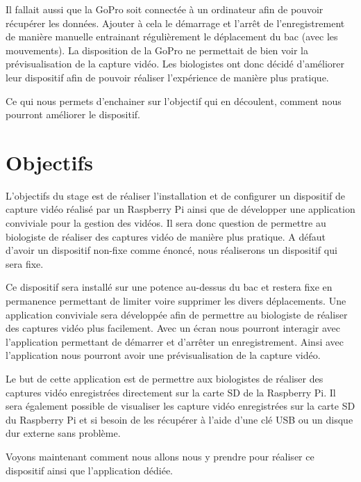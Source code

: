         \vspace{0.2cm}
        
        Il fallait aussi que la GoPro soit connectée à un ordinateur afin de pouvoir récupérer les données.
        Ajouter à cela le démarrage et l'arrêt de l'enregistrement de manière manuelle entrainant régulièrement le déplacement du bac (avec les mouvements). La disposition de la GoPro ne permettait de bien voir la prévisualisation de la capture vidéo.
        Les biologistes ont donc décidé d'améliorer leur dispositif afin de pouvoir réaliser l'expérience de manière plus pratique.

        \vspace{0.2cm}

        Ce qui nous permets d'enchainer sur l'objectif qui en découlent, comment nous pourront améliorer le dispositif.

    

    \vspace{0.1cm}


    \section{Objectifs}
    
        L’objectifs du stage est de réaliser l’installation et de configurer un dispositif de capture vidéo réalisé par un Raspberry Pi ainsi que de développer une application conviviale pour la gestion des vidéos.
        Il sera donc question de permettre au biologiste de réaliser des captures vidéo de manière plus pratique.
        A défaut d'avoir un dispositif non-fixe comme énoncé, nous réaliserons un dispositif qui sera fixe.

        \vspace{0.2cm}

        Ce dispositif sera installé sur une potence au-dessus du bac et restera fixe en permanence permettant de limiter voire supprimer les divers déplacements.                
        Une application conviviale sera développée afin de permettre au biologiste de réaliser des captures vidéo plus facilement.
        Avec un écran nous pourront interagir avec l'application permettant de démarrer et d'arrêter un enregistrement.
        Ainsi avec l'application nous pourront avoir une prévisualisation de la capture vidéo.

        \vspace{0.2cm}
    
        Le but de cette application est de permettre aux biologistes de réaliser des captures vidéo enregistrées directement sur la carte SD de la Raspberry Pi.
        Il sera également possible de visualiser les capture vidéo enregistrées sur la carte SD du Raspberry Pi et si besoin de les récupérer à l'aide d'une clé USB ou un disque dur externe sans problème.

        \vspace{0.2cm}

        Voyons maintenant comment nous allons nous y prendre pour réaliser ce dispositif ainsi que l'application dédiée.
